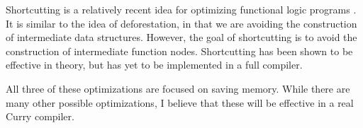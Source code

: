 Shortcutting is a relatively recent idea for optimizing functional logic programs \cite{shortcutting}.
It is similar to the idea of deforestation, in that we are avoiding the construction of intermediate data structures.
However, the goal of shortcutting is to avoid the construction of intermediate function nodes.
Shortcutting has been shown to be effective in theory, but has yet to be implemented in a full compiler.

All three of these optimizations are focused on saving memory.
While there are many other possible optimizations, I believe that these will be effective in a real Curry compiler.

